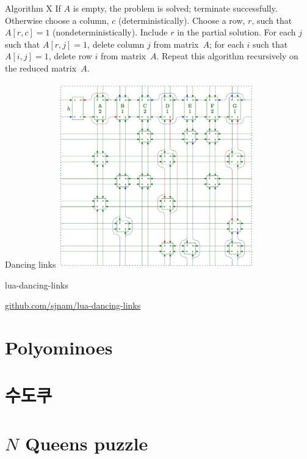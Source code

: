 \documentclass{beamer}
\begin{document}
\begin{frame}[fragile]{Algorithm X}
  \begingroup\obeylines
  \baselineskip10pt
If $A$ is empty, the problem is solved; terminate successfully.
Otherwise choose a column, $c$ (deterministically).
Choose a row, $r$, such that $A[r,c]=1$ (nondeterministically).
Include $r$ in the partial solution.
For each $j$ such that $A[r,j]=1$,
\qquad delete column $j$ from matrix~$A$;
\qquad for each $i$ such that $A[i,j]=1$,
\qquad\qquad delete row $i$ from matrix~$A$.
Repeat this algorithm recursively on the reduced matrix~$A$.
\endgroup
\end{frame}

%
\begin{frame}{Dancing links}
\centering\includegraphics[height=8cm]{dlx.jpg}
\end{frame}

%
\begin{frame}{lua-dancing-links}
\vfill
\begin{center}
\Large
  \href{https://github.com/sjnam/lua-dancing-links}
    {github.com/sjnam/lua-dancing-links}
\end{center}
\vfill
\end{frame}

\section{Polyominoes}

\section{수도쿠}

\section{$N$ Queens puzzle}
\end{document}
